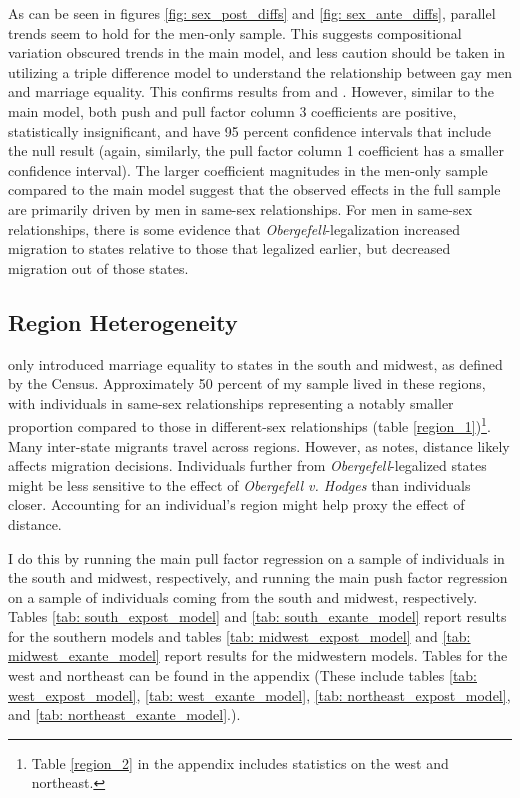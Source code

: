 \documentclass[12pt,letterpaper]{article}
\begin{document}
As can be seen in figures \ref{fig: sex_post_diffs} and \ref{fig: sex_ante_diffs}, parallel trends seem to hold for the men-only sample. This suggests compositional variation obscured trends in the main model, and less caution should be taken in utilizing a triple difference model to understand the relationship between gay men and marriage equality. This confirms results from \citet{1} and \citet{12}. However, similar to the main model, both push and pull factor column 3 coefficients are positive, statistically insignificant, and have 95 percent confidence intervals that include the null result (again, similarly, the pull factor column 1 coefficient has a smaller confidence interval). The larger coefficient magnitudes in the men-only sample compared to the main model suggest that the observed effects in the full sample are primarily driven by men in same-sex relationships. For men in same-sex relationships, there is some evidence that \textit{Obergefell}-legalization increased migration to states relative to those that legalized earlier, but decreased migration out of those states.

\clearpage
\subsection{Region Heterogeneity}

 only introduced marriage equality to states in the south and midwest, as defined by the Census. Approximately 50 percent of my sample lived in these regions, with individuals in same-sex relationships representing a notably smaller proportion compared to those in different-sex relationships (table \ref{region_1})\footnote{Table \ref{region_2} in the appendix includes statistics on the west and northeast.}. Many inter-state migrants travel across regions. However, as \citet{1} notes, distance likely affects migration decisions. Individuals further from \textit{Obergefell}-legalized states might be less sensitive to the effect of \textit{Obergefell v. Hodges} than individuals closer. Accounting for an individual’s region might help proxy the effect of distance.


I do this by running the main pull factor regression on a sample of individuals in the south and midwest, respectively, and running the main push factor regression on a sample of individuals coming from the south and midwest, respectively. Tables \ref{tab: south_expost_model} and \ref{tab: south_exante_model} report results for the southern models and tables \ref{tab: midwest_expost_model} and \ref{tab: midwest_exante_model} report results for the midwestern models. Tables for the west and northeast can be found in the appendix (These include tables \ref{tab: west_expost_model}, \ref{tab: west_exante_model}, \ref{tab: northeast_expost_model}, and \ref{tab: northeast_exante_model}.).
\end{document}
